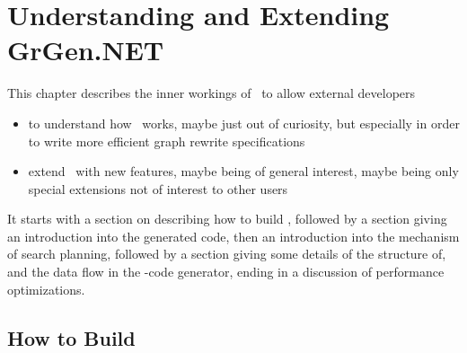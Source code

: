 \chapter{Understanding and Extending GrGen.NET} \label{cha:developing}

This chapter describes the inner workings of \GrG~to allow external developers
\begin{itemize}
\item to understand how \GrG~works, maybe just out of curiosity, but especially in order to write more efficient graph rewrite specifications
\item extend \GrG~with new features, maybe being of general interest, maybe being only special extensions not of interest to other users
\end{itemize}
It starts with a section on describing how to build \GrG, followed by a section giving an introduction into the generated code, then an introduction into the mechanism of search planning, followed by a section giving some details of the structure of, and the data flow in the \GrG-code generator, ending in a discussion of performance optimizations.

\section{How to Build}\label{sub:building}

